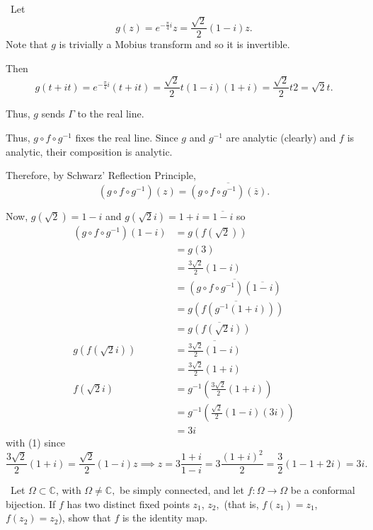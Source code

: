 \documentclass[12pt]{Homework}
\begin{document}
\begin{solution}$\,$
Let $$g(z)=e^{-\frac{\pi}{4}i}z=\frac{\sqrt{2}}{2}(1-i)z.$$ Note that $g$ is trivially a Mobius transform and so it is invertible.

Then $$g(t+it)=e^{-\frac{\pi}{4}i}(t+it)=\frac{\sqrt{2}}{2}t(1-i)(1+i)=\frac{\sqrt{2}}{2}t2=\sqrt{2}t.$$

Thus, $g$ sends $\Gamma$ to the real line.

Thus, $g\circ f\circ g^{-1}$ fixes the real line. Since $g$ and $g^{-1}$ are analytic (clearly) and $f$ is analytic, their composition is analytic.

Therefore, by Schwarz' Reflection Principle, $$(g\circ f\circ g^{-1})(z)=\overline{(g\circ f\circ g^{-1})(\overline{z})}.$$

Now, $g(\sqrt{2})=1-i$ and $g(\sqrt{2}i)=1+i=\overline{1-i}$ so \begin{align*}
    (g\circ f\circ g^{-1})(1-i)&=g(f(\sqrt{2}))\\
    &=g(3)\\
    &=\frac{3\sqrt{2}}{2}(1-i)\\
    &=\overline{(g\circ f\circ g^{-1})(\overline{1-i})}\\
    &=\overline{g(f(g^{-1}(1+i)))}\\
    &=\overline{g(f(\sqrt{2}i))}\\
    g(f(\sqrt{2}i))&=\overline{\frac{3\sqrt{2}}{2}(1-i)}\\
    &=\frac{3\sqrt{2}}{2}(1+i)\\
    f(\sqrt{2}i)&=g^{-1}(\frac{3\sqrt{2}}{2}(1+i))\\
    &=g^{-1}(\frac{\sqrt{2}}{2}(1-i)(3i))\tag{1}\\
    &=3i
\end{align*} with (1) since $$\frac{3\sqrt{2}}{2}(1+i)=\frac{\sqrt{2}}{2}(1-i)z\implies z=3\frac{1+i}{1-i}=3\frac{(1+i)^2}{2}=\frac{3}{2}(1-1+2i)=3i.$$

\end{solution}
\newpage





\begin{problem} $\,$
Let $\Omega\subset\mathbb{C}$, with $\Omega\not=\mathbb{C},$ be simply connected, and let $f:\Omega\to\Omega$ be a conformal bijection. If $f$ has two distinct fixed points $z_1$, $z_2,$ (that is, $f(z_1)=z_1$, $f(z_2)=z_2$), show that $f$ is the identity map.
\end{problem}
\end{document}
